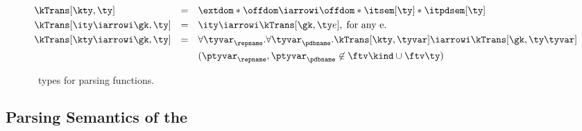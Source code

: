 \begin{figure}
\small
\fbox{$\kTrans[\gk,\ty] = \ity$} 
    
\begin{align*}
  &\kTrans[\kty,\ty] & = & \quad \extdom * \offdom \iarrowi \offdom * \itsem[\ty] * \itpdsem[\ty]
   \\
   &\kTrans[\ity \iarrowi \gk,\ty] & = & \quad \ity \iarrowi \kTrans[\gk,\ty e],
   \; \mbox{for any e}.
   \\
   &\kTrans[\kty \iarrowi \gk,\ty] & = & \quad 
      \forall\tyvar_\repname.\forall\tyvar_\pdbname.
         \kTrans[\kty,\tyvar] \iarrowi \kTrans[\gk,\ty \tyvar] \\
         & & & \quad (\ptyvar_\repname, \ptyvar_\pdbname \not \in \ftv \kind \cup
         \ftv \ty)
\end{align*}  
  \caption{\fomega\ types for parsing functions.}
  \label{fig:parser-types}
\end{figure}

\subsection{Parsing Semantics of the \ddc{}}
\label{sec:parse-sem}


